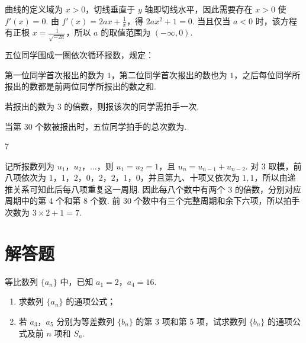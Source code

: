 \begin{solution}
曲线的定义域为 \(x>0\)，切线垂直于 \(y\) 轴即切线水平，因此需要存在 \(x>0\) 使 \(f'(x)=0\). 由 \(f'(x)=2ax+\frac1x\)，得 \(2ax^2+1=0\). 当且仅当 \(a<0\) 时，该方程有正根 \(x=\frac1{\sqrt{-2a}}\)，所以 \(a\) 的取值范围为 \((-\infty,0)\).
\end{solution}

\begin{problem}
五位同学围成一圈依次循环报数，规定：

\begin{circlelist}
\item 第一位同学首次报出的数为 \(1\)，第二位同学首次报出的数也为 \(1\)，之后每位同学所报出的数都是前两位同学所报出的数之和.
\item 若报出的数为 \(3\) 的倍数，则报该次的同学需拍手一次.
\end{circlelist}

当第 \(30\) 个数被报出时，五位同学拍手的总次数为\fillinblank{}.
\end{problem}

\begin{answer}
7
\end{answer}

\begin{solution}
记所报数列为 \(u_1\)，\(u_2\)，\(\ldots\)，则 \(u_1=u_2=1\)，且 \(u_n=u_{n-1}+u_{n-2}\). 对 \(3\) 取模，前八项依次为 \(1\)，\(1\)，\(2\)，\(0\)，\(2\)，\(2\)，\(1\)，\(0\)，并且第九、十项又依次为 \(1,1\)，所以由递推关系可知此后每八项重复这一周期. 因此每八个数中有两个 \(3\) 的倍数，分别对应周期中的第 \(4\) 个和第 \(8\) 个数. 前 \(30\) 个数中有三个完整周期和余下六项，所以拍手次数为 \(3\times2+1=7\).
\end{solution}

\section{解答题}

\begin{problem}
等比数列 \(\{a_{n}\}\) 中，已知 \(a_{1} = 2\)，\(a_{4} = 16\).

\begin{enumerate}
\item 求数列 \( \{a_{n}\} \) 的通项公式；
\item 若 \(a_{3}\)，\(a_{5}\) 分别为等差数列 \( \{b_{n}\} \) 的第 3 项和第 5 项，试求数列 \( \{b_{n}\} \) 的通项公式及前 \(n\) 项和 \( S_{n} \).
\end{enumerate}

\end{problem}


